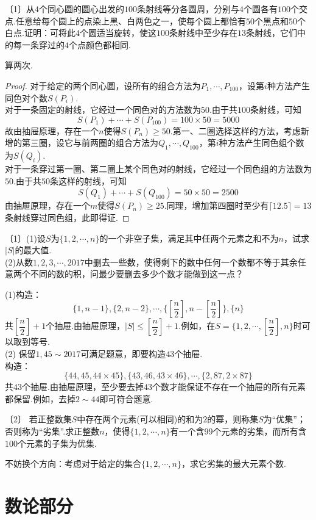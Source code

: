 \documentclass[lang=cn, zihao=4.5]{elegantbook}
\newcommand{\nd}[1]{〔#1〕}
\begin{document}
\begin{example} %
	\nd{1}从$4$个同心圆的圆心出发的$100$条射线等分各圆周，分别与$4$个圆各有$100$个交点.任意给每个圆上的点染上黑、白两色之一，使每个圆上都恰有$50$个黑点和$50$个白点.证明：可将此$4$个圆适当旋转，使这$100$条射线中至少存在$13$条射线，它们中的每一条穿过的$4$个点颜色都相同.
\end{example}
\begin{hint}
	算两次.
\end{hint}
\begin{proof}
	对于给定的两个同心圆，设所有的组合方法为$P_1, \cdots ,P_{100}$，设第$i$种方法产生同色对个数$S(P_i)$. \\
	对于一条固定的射线，它经过一个同色对的方法数为$50$.由于共$100$条射线，可知$$S(P_1) + \cdots + S(P_{100}) = 100 \times 50 = 5000$$
	故由抽屉原理，存在一个$n$使得$S(P_n) \geq 50$.第一、二圈选择这样的方法，考虑新增的第三圈，设它与前两圈的组合方法为$Q_1, \cdots ,Q_{100}$，第$i$种方法产生同色组个数为$S(Q_i)$. \\
	对于一条穿过第一圈、第二圈上某个同色对的射线，它经过一个同色组的方法数为$50$.由于共$50$条这样的射线，可知$$S(Q_1) + \cdots + S(Q_{100}) = 50 \times 50 = 2500$$
	由抽屉原理，存在一个$m$使得$S(P_n) \geq 25$.同理，增加第四圈时至少有$\lceil 12.5 \rceil = 13$条射线穿过同色组，此即得证.
\end{proof}

\begin{example} %
	\nd{1}(1)设$S$为$\{ 1,2, \cdots ,n \}$的一个非空子集，满足其中任两个元素之和不为$n$，试求$|S|$的最大值. \\
	(2)从数$1,2,3, \cdots ,2017$中删去一些数，使得剩下的数中任何一个数都不等于其余任意两个不同的数的积，问最少要删去多少个数才能做到这一点？
\end{example}
\begin{solution}
	(1)构造：$$\{ 1,n-1 \},\{ 2,n-2 \}, \cdots , \{ \left[ \frac{n}{2} \right], n-\left[ \frac{n}{2} \right] \},\{ n \}$$
	共$ \left[ \dfrac{n}{2} \right]+1$个抽屉.由抽屉原理，$|S| \leq \left[ \dfrac{n}{2} \right]+1$.例如，在$S = \{ 1,2, \cdots , \left[ \dfrac{n}{2} \right] ,n \}$时可以取到等号. \\
	(2)\color{guess} 保留$1,45 \sim 2017$可满足题意，即要构造$43$个抽屉. \color{black} \\
	构造：$$\{ 44,45,44 \times 45 \}, \{ 43,46,43 \times 46 \}, \cdots , \{ 2,87,2\times 87 \}$$
	共$43$个抽屉.由抽屉原理，至少要去掉$43$个数才能保证不存在一个抽屉的所有元素都保留.例如，去掉$2 \sim 44$即可符合题意.
\end{solution}

\begin{example} %
	\nd{2} 若正整数集$S$中存在两个元素(可以相同)的和为$2$的幂，则称集$S$为“优集”；否则称为“劣集”.求正整数$n$，使得$\{ 1,2,\cdots ,n \}$有一个含$99$个元素的劣集，而所有含$100$个元素的子集为优集.
\end{example}
\begin{hint}
	不妨换个方向：考虑对于给定的集合$\{ 1,2, \cdots ,n \}$，求它劣集的最大元素个数.
\end{hint}
\begin{solution}
	
\end{solution}

\part{数论部分}
\end{document}
